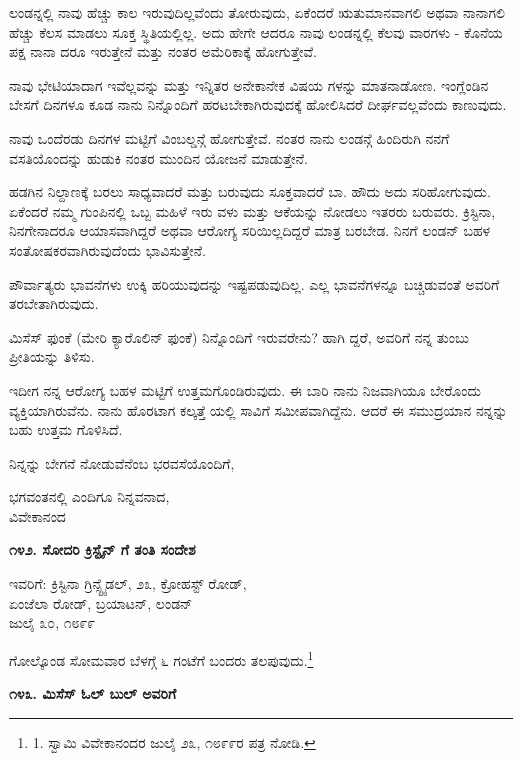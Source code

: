ಲಂಡನ್ನಲ್ಲಿ ನಾವು ಹೆಚ್ಚು ಕಾಲ ಇರುವುದಿಲ್ಲವೆಂದು ತೋರುವುದು, ಏಕೆಂದರೆ ಋತುಮಾನವಾಗಲಿ ಅಥವಾ ನಾನಾಗಲಿ ಹೆಚ್ಚು ಕೆಲಸ ಮಾಡಲು ಸೂಕ್ತ ಸ್ಥಿತಿಯಲ್ಲಿಲ್ಲ. ಅದು ಹೇಗೇ ಆದರೂ ನಾವು ಲಂಡನ್ನಲ್ಲಿ ಕೆಲವು ವಾರಗಳು - ಕೊನೆಯ ಪಕ್ಷ ನಾನಾ ದರೂ ಇರುತ್ತೇನೆ ಮತ್ತು ನಂತರ ಅಮೆರಿಕಾಕ್ಕೆ ಹೋಗುತ್ತೇವೆ.

ನಾವು ಭೇಟಿಯಾದಾಗ ಇವೆಲ್ಲವನ್ನು ಮತ್ತು ಇನ್ನಿತರ ಅನೇಕಾನೇಕ ವಿಷಯ ಗಳನ್ನು ಮಾತನಾಡೋಣ. ಇಂಗ್ಲೆಂಡಿನ ಬೇಸಗೆ ದಿನಗಳೂ ಕೂಡ ನಾನು ನಿನ್ನೊಂದಿಗೆ ಹರಟಬೇಕಾಗಿರುವುದಕ್ಕೆ ಹೋಲಿಸಿದರೆ ದೀರ್ಘವಲ್ಲವೆಂದು ಕಾಣುವುದು.

ನಾವು ಒಂದೆರಡು ದಿನಗಳ ಮಟ್ಟಿಗೆ ವಿಂಬಲ್ಡನ್ಗೆ ಹೋಗುತ್ತೇವೆ. ನಂತರ ನಾನು ಲಂಡನ್ಗೆ ಹಿಂದಿರುಗಿ ನನಗೆ ವಸತಿಯೊಂದನ್ನು ಹುಡುಕಿ ನಂತರ ಮುಂದಿನ ಯೋಜನೆ ಮಾಡುತ್ತೇನೆ.

ಹಡಗಿನ ನಿಲ್ದಾಣಕ್ಕೆ ಬರಲು ಸಾಧ್ಯವಾದರೆ ಮತ್ತು ಬರುವುದು ಸೂಕ್ತವಾದರೆ ಬಾ. ಹೌದು ಅದು ಸರಿಹೋಗುವುದು. ಏಕೆಂದರೆ ನಮ್ಮ ಗುಂಪಿನಲ್ಲಿ ಒಬ್ಬ ಮಹಿಳೆ ಇರು ವಳು ಮತ್ತು ಆಕೆಯನ್ನು ನೋಡಲು ಇತರರು ಬರುವರು. ಕ್ರಿಸ್ಟಿನಾ, ನಿನಗೇನಾದರೂ ಆಯಾಸವಾಗಿದ್ದರೆ ಅಥವಾ ಆರೋಗ್ಯ ಸರಿಯಿಲ್ಲದಿದ್ದರೆ ಮಾತ್ರ ಬರಬೇಡ. ನಿನಗೆ ಲಂಡನ್ ಬಹಳ ಸಂತೋಷಕರವಾಗಿರುವುದೆಂದು ಭಾವಿಸುತ್ತೇನೆ.

ಪೌರ್ವಾತ್ಯರು ಭಾವನೆಗಳು ಉಕ್ಕಿ ಹರಿಯುವುದನ್ನು ಇಷ್ಟಪಡುವುದಿಲ್ಲ. ಎಲ್ಲ ಭಾವನೆಗಳನ್ನೂ ಬಚ್ಚಿಡುವಂತೆ ಅವರಿಗೆ ತರಬೇತಾಗಿರುವುದು.

ಮಿಸೆಸ್ ಫುಂಕೆ (ಮೇರಿ ಕ್ಯಾರೊಲಿನ್ ಫುಂಕೆ) ನಿನ್ನೊಂದಿಗೆ ಇರುವರೇನು? ಹಾಗಿ ದ್ದರೆ, ಅವರಿಗೆ ನನ್ನ ತುಂಬು ಪ್ರೀತಿಯನ್ನು ತಿಳಿಸು.

ಇದೀಗ ನನ್ನ ಆರೋಗ್ಯ ಬಹಳ ಮಟ್ಟಿಗೆ ಉತ್ತಮಗೊಂಡಿರುವುದು. ಈ ಬಾರಿ ನಾನು ನಿಜವಾಗಿಯೂ ಬೇರೊಂದು ವ್ಯಕ್ತಿಯಾಗಿರುವೆನು. ನಾನು ಹೊರಟಾಗ ಕಲ್ಕತ್ತೆ ಯಲ್ಲಿ ಸಾವಿಗೆ ಸಮೀಪವಾಗಿದ್ದೆನು. ಆದರೆ ಈ ಸಮುದ್ರಯಾನ ನನ್ನನ್ನು ಬಹು ಉತ್ತಮ ಗೊಳಿಸಿದೆ.

ನಿನ್ನನ್ನು ಬೇಗನೆ ನೋಡುವೆನೆಂಬ ಭರವಸೆಯೊಂದಿಗೆ,

\begin{flushright}
ಭಗವಂತನಲ್ಲಿ ಎಂದಿಗೂ ನಿನ್ನವನಾದ,\\ವಿವೇಕಾನಂದ
\end{flushright}

\begin{center}
\textbf{೧೪೨. ಸೋದರಿ ಕ್ರಿಸ್ಟೈನ್ ಗೆ ತಂತಿ ಸಂದೇಶ}
\end{center}

\begin{flushright}
ಇವರಿಗೆ: ಕ್ರಿಸ್ಟಿನಾ ಗ್ರಿನ್ಸ್ಟೈಡಲ್, ೨೩, ಕ್ರೋಹಸ್ಟ್ ರೋಡ್,\\ಏಂಜೆಲಾ ರೋಡ್, ಬ್ರಯಾಟನ್, ಲಂಡನ್\\ಜುಲೈ ೩೦, ೧೮೯೯
\end{flushright}

ಗೋಲ್ಕೊಂಡ ಸೋಮವಾರ ಬೆಳಗ್ಗೆ ೬ ಗಂಟೆಗೆ ಬಂದರು ತಲಪುವುದು.\footnote{1. ಸ್ವಾಮಿ ವಿವೇಕಾನಂದರ ಜುಲೈ ೨೩, ೧೮೯೯ರ ಪತ್ರ ನೋಡಿ.}

\begin{center}
\textbf{೧೪೩. ಮಿಸೆಸ್ ಓಲ್ ಬುಲ್ ಅವರಿಗೆ}
\end{center}

